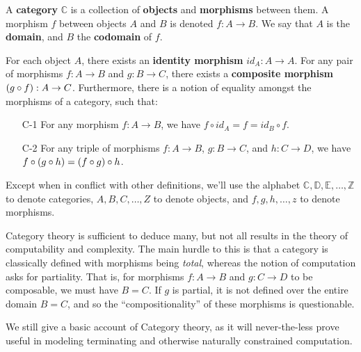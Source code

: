 \begin{specification} A \textbf{category} $\mathbb{C}$ is a collection of
\textbf{objects} and \textbf{morphisms} between them. A morphism $f$ between
objects $A$ and $B$ is denoted $f:A\rightarrow B$. We say that $A$ is the
\textbf{domain}, and $B$ the \textbf{codomain} of $f$.

For each object $A$, there exists an \textbf{identity morphism}
$id_A:A\rightarrow A$. For any pair of morphisms $f : A\rightarrow B$ and $g :
B \rightarrow C$, there exists a \textbf{composite morphism} $\mathopen{}\left({g\circ f}\right)\mathclose{} : A
\rightarrow C$.  Furthermore, there is a notion of equality amongst the
morphisms of a category, such that:

\begin{enumerate}

\item [C-1] For any morphism $f:A\rightarrow B$, we have $f\circ id_A = f =
id_B \circ f$.

\item [C-2] For any triple of morphisms $f : A \rightarrow B$, $g : B
\rightarrow C$, and $h : C \rightarrow D$, we have $f\circ \mathopen{}\left({g \circ h}\right)\mathclose{} =
\mathopen{}\left({f\circ g}\right)\mathclose{} \circ h$.

\end{enumerate}

\end{specification}

\begin{notation} Except when in conflict with other definitions, we'll use the
alphabet $\mathbb{C},\mathbb{D},\mathbb{E},\ldots,\mathbb{Z}$ to denote
categories, $A,B,C,\ldots,Z$ to denote objects, and $f,g,h,\ldots,z$ to denote
morphisms.  \end{notation}


Category theory is sufficient to deduce many, but not all results in the theory
of computability and complexity\cite{di-paola-heller-1987}. The main hurdle to
this is that a category is classically defined with morphisms being
\emph{total}, whereas the notion of computation asks for partiality. That is,
for morphisms $f : A \rightarrow B$ and $g : C \rightarrow D$ to be composable,
we must have $B=C$. If $g$ is partial, it is not defined over the entire domain
$B=C$, and so the ``compositionality'' of these morphisms is questionable.

We still give a basic account of Category theory, as it will never-the-less
prove useful in modeling terminating and otherwise naturally constrained
computation.
